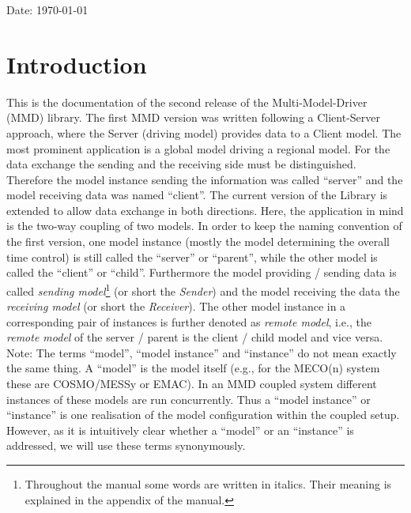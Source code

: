 \documentclass[twoside]{article}
\begin{document}
\begin{center}
  Date: \today
\end{center}

\newpage%

\sloppy

\tableofcontents
\clearpage


\section{Introduction}
This is the documentation of the second release of the Multi-Model-Driver (MMD)
library. The first MMD version was written following a Client-Server
approach, where the Server (driving model) provides data  
to a Client model. The most prominent
application is a global model driving a regional model. 
For the data exchange the sending and the receiving side must be distinguished.
Therefore the model instance sending the information was called ``server'' and
 the model receiving data was named ``client''.
The current version of the Library is extended to allow data exchange in both
directions. Here, the application in mind is the two-way coupling of
two models. In order to keep the naming convention of the first
version, one model instance (mostly the model determining the overall
time control) 
is still called the ``server'' or ``parent'', while the other model is
called the ``client'' or ``child''. 
Furthermore the model providing / sending data is called {\it sending
model}\footnote{ 
Throughout the manual some words are written in italics. Their meaning
is explained in the appendix of the manual.} (or
short the {\it Sender}) and the model receiving the data the {\it receiving
model} (or short the {\it Receiver}). 
The other model instance in a corresponding pair of instances  is
further denoted as {\it remote model}, i.e.,  
the {\it remote model} of the server / parent is the client / child
model and vice versa. Note: The terms ``model'', ``model instance''
and ``instance'' do not mean exactly the same thing. A ``model'' is
the model itself (e.g., for the MECO(n) system these are COSMO/MESSy
or EMAC). In an MMD coupled system different instances of these
models are run concurrently. Thus a ``model instance'' or ``instance''
is one realisation of the model configuration within the coupled setup.
However, as it is intuitively clear whether a ``model'' or an
``instance'' is addressed, we will use these terms synonymously.
\end{document}
